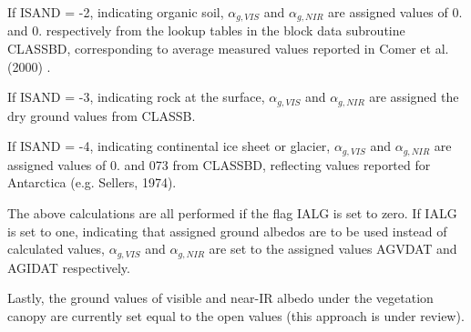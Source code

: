 If I\+S\+A\+N\+D = -\/2, indicating organic soil, $\alpha_{g,VIS}$ and $\alpha_{g,NIR}$ are assigned values of 0. and 0. respectively from the lookup tables in the block data subroutine C\+L\+A\+S\+S\+B\+D, corresponding to average measured values reported in Comer et al. (2000) \cite{Comer2000-mz}.

If I\+S\+A\+N\+D = -\/3, indicating rock at the surface, $\alpha_{g,VIS}$ and $\alpha_{g,NIR}$ are assigned the dry ground values from C\+L\+A\+S\+S\+B.

If I\+S\+A\+N\+D = -\/4, indicating continental ice sheet or glacier, $\alpha_{g,VIS}$ and $\alpha_{g,NIR}$ are assigned values of 0. and 073 from C\+L\+A\+S\+S\+B\+D, reflecting values reported for Antarctica (e.\+g. Sellers, 1974).

The above calculations are all performed if the flag I\+A\+L\+G is set to zero. If I\+A\+L\+G is set to one, indicating that assigned ground albedos are to be used instead of calculated values, $\alpha_{g,VIS}$ and $\alpha_{g,NIR}$ are set to the assigned values A\+G\+V\+D\+A\+T and A\+G\+I\+D\+A\+T respectively.

Lastly, the ground values of visible and near-\/\+I\+R albedo under the vegetation canopy are currently set equal to the open values (this approach is under review).
